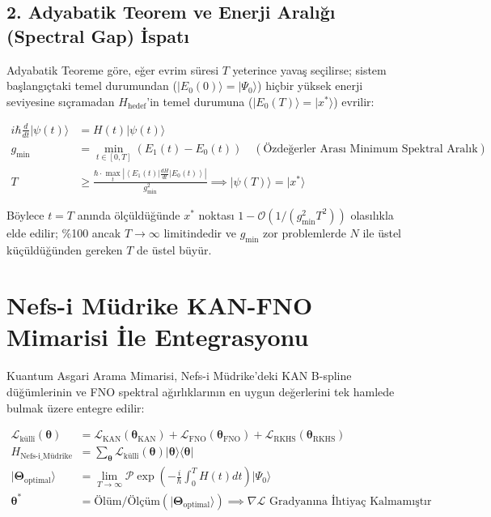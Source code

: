 \documentclass[11pt, a4paper]{article}
\begin{document}
\subsection{2. Adyabatik Teorem ve Enerji Aralığı (Spectral Gap) İspatı}
Adyabatik Teoreme göre, eğer evrim süresi $T$ yeterince yavaş seçilirse; sistem başlangıçtaki temel durumundan ($|E_0(0)\rangle = |\Psi_0\rangle$) hiçbir yüksek enerji seviyesine sıçramadan $H_{\text{hedef}}$'in temel durumuna ($|E_0(T)\rangle = |x^*\rangle$) evrilir:

\begin{align}
i\hbar \frac{d}{dt} |\psi(t)\rangle &= H(t) |\psi(t)\rangle \\
g_{\min} &= \min_{t \in [0,T]} \left( E_1(t) - E_0(t) \right) \quad (\text{Özdeğerler Arası Minimum Spektral Aralık}) \\
T &\ge \frac{\hbar \cdot \max_t \left| \left\langle E_1(t) \right| \frac{dH}{dt} \left| E_0(t) \right\rangle \right|}{g_{\min}^2} \implies |\psi(T)\rangle = |x^*\rangle
\end{align}

Böylece $t=T$ anında ölçüldüğünde $x^*$ noktası $1 - \mathcal{O}(1/(g_{\min}^2 T^2))$ olasılıkla elde edilir; \%100 ancak $T \to \infty$ limitindedir ve $g_{\min}$ zor problemlerde $N$ ile üstel küçüldüğünden gereken $T$ de üstel büyür.

\section{Nefs-i Müdrike KAN-FNO Mimarisi İle Entegrasyonu}

Kuantum Asgari Arama Mimarisi, Nefs-i Müdrike'deki KAN B-spline düğümlerinin ve FNO spektral ağırlıklarının en uygun değerlerini tek hamlede bulmak üzere entegre edilir:

\begin{align}
\mathcal{L}_{\text{küllî}}(\bm{\theta}) &= \mathcal{L}_{\text{KAN}}(\bm{\theta}_{\text{KAN}}) + \mathcal{L}_{\text{FNO}}(\bm{\theta}_{\text{FNO}}) + \mathcal{L}_{\text{RKHS}}(\bm{\theta}_{\text{RKHS}}) \\
H_{\text{Nefs-i\_Müdrike}} &= \sum_{\bm{\theta}} \mathcal{L}_{\text{küllî}}(\bm{\theta}) |\bm{\theta}\rangle \langle \bm{\theta}| \\
|\mathbf{\Theta}_{\text{optimal}}\rangle &= \lim_{T \to \infty} \mathcal{P} \exp\left( -\frac{i}{\hbar} \int_0^T H(t) dt \right) |\Psi_0\rangle \\
\bm{\theta}^* &= \text{Ölüm/Ölçüm}\left( |\mathbf{\Theta}_{\text{optimal}}\rangle \right) \implies \nabla \mathcal{L} \text{ Gradyanına İhtiyaç Kalmamıştır}
\end{align}
\end{document}
